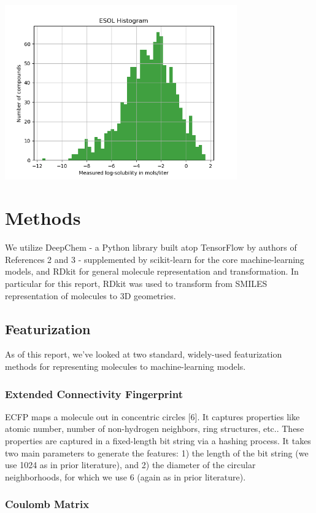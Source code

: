 \documentclass{article}
\begin{document}
\includegraphics[width=0.75\textwidth]{esolhist}

\section{Methods}

We utilize DeepChem - a Python library built atop TensorFlow by authors of References 2 and 3 - supplemented by scikit-learn for the core machine-learning models, and RDkit for general molecule representation and transformation. In particular for this report, RDkit was used to transform from SMILES representation of molecules to 3D geometries.

\subsection{Featurization}

As of this report, we've looked at two standard, widely-used featurization methods for representing molecules to machine-learning models.

\subsubsection{Extended Connectivity Fingerprint}

ECFP maps a molecule out in concentric circles [6]. It captures properties like atomic number, number of non-hydrogen neighbors, ring structures, etc.. These properties are captured in a fixed-length bit string via a hashing process. It takes two main parameters to generate the features: 1) the length of the bit string (we use 1024 as in prior literature), and 2) the diameter of the circular neighborhoods, for which we use 6 (again as in prior literature).

\subsubsection{Coulomb Matrix}
\end{document}
